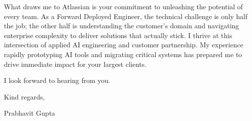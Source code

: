 \documentclass[11pt,a4paper]{article}
\begin{document}
What draws me to Atlassian is your commitment to unleashing the potential of every team. As a Forward Deployed Engineer, the technical challenge is only half the job; the other half is understanding the customer's domain and navigating enterprise complexity to deliver solutions that actually stick. I thrive at this intersection of applied AI engineering and customer partnership. My experience rapidly prototyping AI tools and migrating critical systems has prepared me to drive immediate impact for your largest clients.

I look forward to hearing from you.

Kind regards,

Prabhavit Gupta
\end{document}
